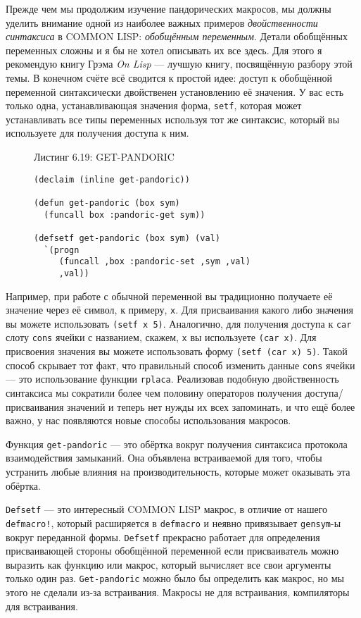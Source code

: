 Прежде чем мы продолжим изучение пандорических макросов, мы должны уделить внимание одной из наиболее важных примеров \emph{двойственности синтаксиса} в COMMON LISP: \emph{обобщённым переменным}. Детали обобщённых переменных сложны и я бы не хотел описывать их все здесь. Для этого я рекомендую книгу Грэма \emph{On Lisp} --- лучшую книгу, посвящённую разбору этой темы. В конечном счёте всё сводится к простой идее: доступ к обобщённой переменной синтаксически двойственен установлению её значения. У вас есть только одна, устанавливающая значения форма, \verb"setf", которая может устанавливать все типы переменных используя тот же синтаксис, который вы используете для получения доступа к ним.

\begin{figure}Листинг 6.19: GET-PANDORIC\label{listing_6.19}
\listbegin
\begin{verbatim}
(declaim (inline get-pandoric))

(defun get-pandoric (box sym)
  (funcall box :pandoric-get sym))

(defsetf get-pandoric (box sym) (val)
  `(progn
     (funcall ,box :pandoric-set ,sym ,val)
     ,val))
\end{verbatim}
\listend
\end{figure}

Например, при работе с обычной переменной вы традиционно получаете её значение через её символ, к примеру, \verb"x". Для присваивания какого либо значения вы можете использовать \verb"(setf x 5)". Аналогично, для получения доступа к \verb"car" слоту \verb"cons" ячейки с названием, скажем, \verb"x" вы используете \verb"(car x)". Для присвоения значения вы можете использовать форму \verb"(setf (car x) 5)". Такой способ скрывает тот факт, что правильный способ изменить данные \verb"cons" ячейки --- это использование функции \verb"rplaca". Реализовав подобную двойственность синтаксиса мы сократили более чем половину операторов получения доступа/присваивания значений и теперь нет нужды их всех запоминать, и что ещё более важно, у нас появляются новые способы использования макросов.

Функция \verb"get-pandoric" --- это обёртка вокруг получения синтаксиса протокола взаимодействия замыканий. Она объявлена встраиваемой для того, чтобы устранить любые влияния на производительность, которые может оказывать эта обёртка.

\verb"Defsetf" --- это интересный COMMON LISP макрос, в отличие от нашего \verb"defmacro!", который расширяется в \verb"defmacro" и неявно привязывает \verb"gensym"-ы вокруг переданной формы. \verb"Defsetf" прекрасно работает для определения присваивающей стороны обобщённой переменной если присваиватель можно выразить как функцию или макрос, который вычисляет все свои аргументы только один раз. \verb"Get-pandoric" можно было бы определить как макрос, но мы этого не сделали из-за встраивания. Макросы не для встраивания, компиляторы для встраивания.

